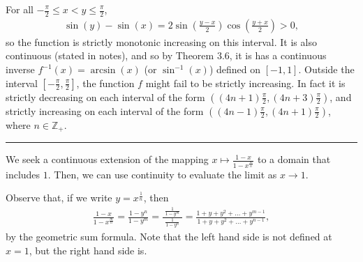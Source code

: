 \documentclass[letterpaper,10pt,english]{jupyterBook}
\begin{document}
\sphinxAtStartPar
{\hyperref[\detokenize{Problems:id32}]{}} For all \(-\frac{\pi}{2} \leq x < y \leq \frac{\pi}{2}\),
\begin{equation*}
\begin{split}
\sin(y) - \sin(x) = 2\sin\left(\frac{y - x}{2}\right)\cos\left(\frac{y + x}{2}\right) > 0,
\end{split}
\end{equation*}
\sphinxAtStartPar
so the function is strictly monotonic increasing on this interval. It is also continuous (stated in notes), and so by Theorem 3.6, it is has a continuous inverse \(f^{-1}(x) = \arcsin(x)\) (or \(\sin^{-1}(x)\)) defined on \([-1, 1]\). Outside the interval \(\left[-\frac{\pi}{2}, \frac{\pi}{2}\right]\), the function \(f\) might fail to be strictly increasing. In fact it is strictly decreasing on each interval of the form \(\left((4n+1)\frac{\pi}{2}, (4n + 3)\frac{\pi}{2}\right)\), and strictly increasing on each interval of the form \(\left((4n-1)\frac{\pi}{2}, (4n + 1)\frac{\pi}{2}\right)\), where \(n\in\mathbb{Z}_+\).


\bigskip\hrule\bigskip


\sphinxAtStartPar
{\hyperref[\detokenize{Problems:id33}]{}} We seek a continuous extension of the mapping \(x\mapsto \frac{1-x}{1-x^{\frac{m}{n}}}\) to a domain that includes \(1\). Then, we can use continuity to evaluate the limit as \(x\rightarrow 1\).

Observe that, if we write \(y = x^{\frac{1}{n}}\), then
\begin{equation*}
\begin{split}
\frac{1 - x}{1 - x^{\frac{m}{n}}} = \frac{1 - y^{n}}{1 - y^{m}} = \frac{\;\frac{1}{1-y^m}\;}{\;\frac{1}{1-y^n}\;} = \frac{1+y+y^2+\ldots+y^{m-1}}{1+y+y^2+\ldots+y^{n-1}},
\end{split}
\end{equation*}
\sphinxAtStartPar
by the geometric sum formula. Note that the left hand side is not defined at \(x=1\), but the right hand side is.
\end{document}
